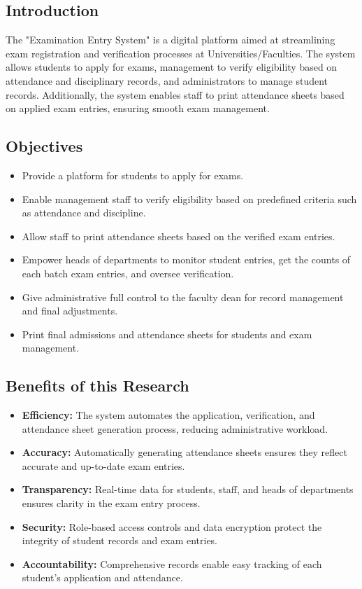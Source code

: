 \documentclass[12pt]{article}
\begin{document}
\subsection{Introduction}
The "Examination Entry System" is a digital platform aimed at streamlining exam registration and verification processes at Universities/Faculties. The system allows students to apply for exams, management to verify eligibility based on attendance and disciplinary records, and administrators to manage student records. Additionally, the system enables staff to print attendance sheets based on applied exam entries, ensuring smooth exam management.

\subsection{Objectives}
\begin{itemize}
    \item Provide a platform for students to apply for exams.
    \item Enable management staff to verify eligibility based on predefined criteria such as attendance and discipline.
    \item Allow staff to print attendance sheets based on the verified exam entries.
    \item Empower heads of departments to monitor student entries, get the counts of each batch exam entries, and oversee verification.
    \item Give administrative full control to the faculty dean for record management and final adjustments.
    \item Print final admissions and attendance sheets for students and exam management.
\end{itemize}

\subsection{Benefits of this Research}
\begin{itemize}
    \item \textbf{Efficiency:} The system automates the application, verification, and attendance sheet generation process, reducing administrative workload.
    \item \textbf{Accuracy:} Automatically generating attendance sheets ensures they reflect accurate and up-to-date exam entries.
    \item \textbf{Transparency:} Real-time data for students, staff, and heads of departments ensures clarity in the exam entry process.
    \item \textbf{Security:} Role-based access controls and data encryption protect the integrity of student records and exam entries.
    \item \textbf{Accountability:} Comprehensive records enable easy tracking of each student’s application and attendance.
\end{itemize}
\end{document}

